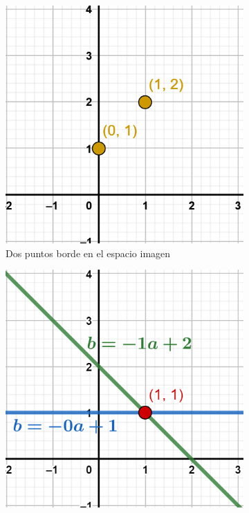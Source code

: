 \begin{figure}
    \centering
    \begin{subfigure}[b]{0.3\textwidth}
        \centering
        \includegraphics[width=\textwidth]{imaxes/c-bases-teoricas/hough-1}
        \caption{Dos puntos borde en el espacio imagen}
        \label{fig:hough-punto-imagen}
    \end{subfigure}
    \hfill
    \begin{subfigure}[b]{0.3\textwidth}
        \centering
        \includegraphics[width=\textwidth]{imaxes/c-bases-teoricas/hough-2}

\end{subfigure}
\end{figure}

